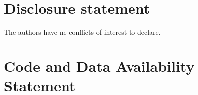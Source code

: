 \documentclass[12pt]{article}
\theoremstyle{plain}
\theoremstyle{definition}
\begin{document}

\section{Disclosure statement}
\label{disclosure-statement}

The authors have no conflicts of interest to declare.

\section{Code and Data Availability Statement}
\label{data-availability-statement}

\label{supplementary-material}
\bigskip
\end{document}
